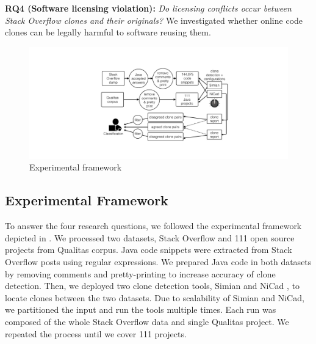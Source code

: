 \documentclass[sigconf,review, anonymous]{acmart}
\begin{document}
\textbf{RQ4 (Software licensing violation):} \textit{Do licensing conflicts occur between Stack Overflow clones and their originals?} We investigated whether online code clones can be legally harmful to software reusing them.

\begin{figure}
	\centering
	\includegraphics[width=0.8\linewidth]{exp_framework_new}
	\caption{Experimental framework}
	\label{fig:exp_framework}
\end{figure}

\subsection{Experimental Framework}
To answer the four research questions, we followed the experimental framework depicted in . We processed two datasets, Stack Overflow and 111 open source projects from Qualitas corpus. Java code snippets were extracted from Stack Overflow posts using regular expressions. We prepared Java code in both datasets by removing comments and pretty-printing to increase accuracy of clone detection. Then, we deployed two clone detection tools, Simian \cite{simian} and NiCad \cite{Roy2008,Cordy}, to locate clones between the two datasets. Due to scalability of Simian and NiCad, we partitioned the input and run the tools multiple times. Each run was composed of the whole Stack Overflow data and single Qualitas project. We repeated the process until we cover 111 projects. 
\end{document}

